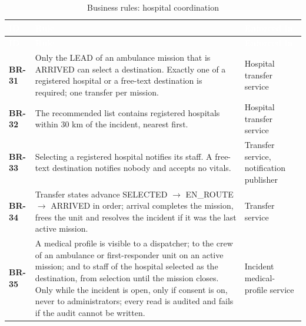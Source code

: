 {\tabfont\rowband
\begin{longtable}{@{}>{\raggedright\arraybackslash}p{}>{\raggedright\arraybackslash}p{}>{\raggedright\arraybackslash}p{}@{}}
\caption{Business rules: hospital coordination}\label{tab:br-hospital}\\
\rowcolor{najdanavy}\textcolor{white}{\sffamily\bfseries\small ID} & \textcolor{white}{\sffamily\bfseries\small Rule} & \textcolor{white}{\sffamily\bfseries\small Enforced in}\\
\endfirsthead
\rowcolor{najdanavy}\textcolor{white}{\sffamily\bfseries\small ID} & \textcolor{white}{\sffamily\bfseries\small Rule} & \textcolor{white}{\sffamily\bfseries\small Enforced in}\\
\endhead
\bottomrule\endlastfoot
\textbf{BR-31} & Only the LEAD of an ambulance mission that is ARRIVED can select a destination. Exactly one of a registered hospital or a free-text destination is required; one transfer per mission. & Hospital transfer service\\
\textbf{BR-32} & The recommended list contains registered hospitals within 30 km of the incident, nearest first. & Hospital transfer service\\
\textbf{BR-33} & Selecting a registered hospital notifies its staff. A free-text destination notifies nobody and accepts no vitals. & Transfer service, notification publisher\\
\textbf{BR-34} & Transfer states advance SELECTED $\rightarrow$ EN\_\allowbreak{}ROUTE $\rightarrow$ ARRIVED in order; arrival completes the mission, frees the unit and resolves the incident if it was the last active mission. & Transfer service\\
\textbf{BR-35} & A medical profile is visible to a dispatcher; to the crew of an ambulance or first-responder unit on an active mission; and to staff of the hospital selected as the destination, from selection until the mission closes. Only while the incident is open, only if consent is on, never to administrators; every read is audited and fails if the audit cannot be written. & Incident medical-profile service\\
\end{longtable}}
